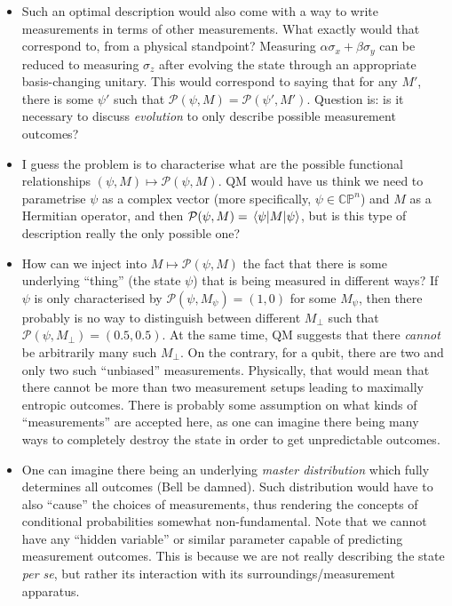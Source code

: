 \documentclass[a4paper]{report}
\newcommand{\calP}{{\mathcal{P}}}
\begin{document}
\begin{itemize}
	\item Such an optimal description would also come with a way to write measurements in terms of other measurements. What exactly would that correspond to, from a physical standpoint? Measuring $\alpha\sigma_x+\beta\sigma_y$ can be reduced to measuring $\sigma_z$ after evolving the state through an appropriate basis-changing unitary.
	This would correspond to saying that for any $M'$, there is some $\psi'$ such that $\calP(\psi,M)=\calP(\psi',M')$.
	Question is: is it necessary to discuss \emph{evolution} to only describe possible measurement outcomes?
	\item I guess the problem is to characterise what are the possible functional relationships $(\psi,M)\mapsto \calP(\psi,M)$. QM would have us think we need to parametrise $\psi$ as a complex vector (more specifically, $\psi\in\mathbb{CP}^n$) and $M$ as a Hermitian operator, and then $\calP(\psi,M)=\mel{\psi}{M}{\psi}$, but is this type of description really the only possible one?
	\item How can we inject into $M\mapsto \calP(\psi,M)$ the fact that there is some underlying ``thing'' (the state $\psi$) that is being measured in different ways? If $\psi$ is only characterised by $\calP(\psi,M_\psi)=(1,0)$ for some $M_\psi$, then there probably is no way to distinguish between different $M_\perp$ such that $\calP(\psi,M_\perp)=(0.5,0.5)$.
	At the same time, QM suggests that there \emph{cannot} be arbitrarily many such $M_\perp$. On the contrary, for a qubit, there are two and only two such ``unbiased'' measurements.
	Physically, that would mean that there cannot be more than two measurement setups leading to maximally entropic outcomes.
	There is probably some assumption on what kinds of ``measurements'' are accepted here, as one can imagine there being many ways to completely destroy the state in order to get unpredictable outcomes.
	\item One can imagine there being an underlying \emph{master distribution} which fully determines all outcomes (Bell be damned).
	Such distribution would have to also ``cause'' the choices of measurements, thus rendering the concepts of conditional probabilities somewhat non-fundamental.
	Note that we cannot have any ``hidden variable'' or similar parameter capable of predicting measurement outcomes. This is because we are not really describing the state \emph{per se}, but rather its interaction with its surroundings/measurement apparatus.
\end{itemize}
\end{document}

